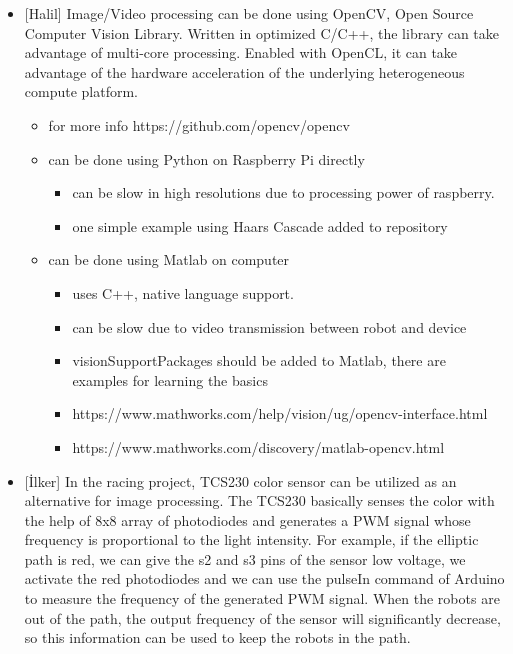 \documentclass[a4paper,12pt]{article}
\begin{document}
\begin{itemize}
\begin{itemize}
		\end{itemize}
	\item {[Halil]} Image/Video processing can be done using OpenCV, Open Source Computer Vision Library. Written in optimized C/C++, the library can take advantage of multi-core processing. Enabled with OpenCL, it can take advantage of the hardware acceleration of the underlying heterogeneous compute platform.
		\begin{itemize}
			\item for more info https://github.com/opencv/opencv
			\item can be done using Python on Raspberry Pi directly
				\begin{itemize}
					\item can be slow in high resolutions due to processing power of raspberry.
					\item one simple example using Haars Cascade added to repository
				\end{itemize}
			\item can be done using Matlab on computer
				\begin{itemize}
					\item uses C++, native language support.
					\item can be slow due to video transmission between robot and device
					\item visionSupportPackages should be added to Matlab, there are examples for learning the basics
					\item https://www.mathworks.com/help/vision/ug/opencv-interface.html
					\item https://www.mathworks.com/discovery/matlab-opencv.html
				\end{itemize}
		\end{itemize}
	\item {[İlker]} In the racing project, TCS230 color sensor can be utilized as an alternative for image processing. The TCS230 basically senses the color with the help of 8x8 array of photodiodes and generates a PWM signal whose frequency is proportional to the light intensity. For example, if the elliptic path is red, we can give the s2 and s3 pins of the sensor low voltage, we activate the red photodiodes and we can use the pulseIn command of Arduino to measure the frequency of the generated PWM signal. When the robots are out of the path, the output frequency of the sensor will significantly decrease, so this information can be used to keep the robots in the path.  	  
\end{itemize}
\end{document}
